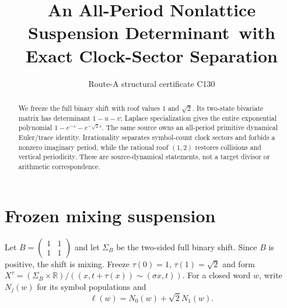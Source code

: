 \documentclass[10pt]{article}
\title{An All-Period Nonlattice Suspension Determinant\
with Exact Clock-Sector Separation}
\author{Route-A structural certificate C130}
\date{}
\begin{document}
\maketitle
\begin{abstract}
We freeze the full binary shift with roof values $1$ and $\sqrt2$.  Its
two-state bivariate matrix has determinant $1-u-v$; Laplace specialization
gives the entire exponential polynomial
$1-e^{-s}-e^{-\sqrt2s}$.  The same source owns an all-period primitive
dynamical Euler/trace identity.  Irrationality separates symbol-count clock
sectors and forbids a nonzero imaginary period, while the rational roof
$(1,2)$ restores collisions and vertical periodicity.  These are
source-dynamical statements, not a target divisor or arithmetic correspondence.
\end{abstract}

\section{Frozen mixing suspension}
Let $B=\left(\begin{smallmatrix}1&1\\1&1\end{smallmatrix}\right)$ and let
$\Sigma_B$ be the two-sided full binary shift.  Since $B$ is positive, the
shift is mixing.  Freeze $\tau(0)=1$, $\tau(1)=\sqrt2$ and form
$X^\tau=(\Sigma_B\times\mathbb R)/((x,t+\tau(x))\sim(\sigma x,t))$.
For a closed word $w$, write $N_j(w)$ for its symbol populations and
\[
\ell(w)=N_0(w)+\sqrt2N_1(w).
\]
\end{document}
